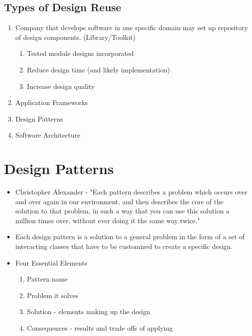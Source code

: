 \documentclass{report}
\begin{document}
			\subsection{Types of Design Reuse}
				\begin{enumerate}
					\item Company that develops software in one specific domain may set up repository of design components. (Library/Toolkit)
						\begin{enumerate}
							\item Tested module designs incorporated
							\item Reduce design time (and likely implementation)
							\item Increase design quality
						\end{enumerate}
					\item Application Frameworks
					\item Design Patterns
					\item Software Architecture
				\end{enumerate}
		\section{Design Patterns}
			\begin{itemize}
				\item Christopher Alexander - "Each pattern describes a problem which occurs over and over again in our environment, and then describes the core of the solution to that problem, in such a way that you can use this solution a million times over, without ever doing it the same way twice."
				\item Each design pattern is a solution to a general problem in the form of a set of interacting classes that have to be customized to create a specific design.
				\item Four Essential Elements
					\begin{enumerate}
						\item Pattern name
						\item Problem it solves
						\item Solution - elements making up the design
						\item Consequences - results and trade offs of applying	
					\end{enumerate}
			\end{itemize}
\end{document}
